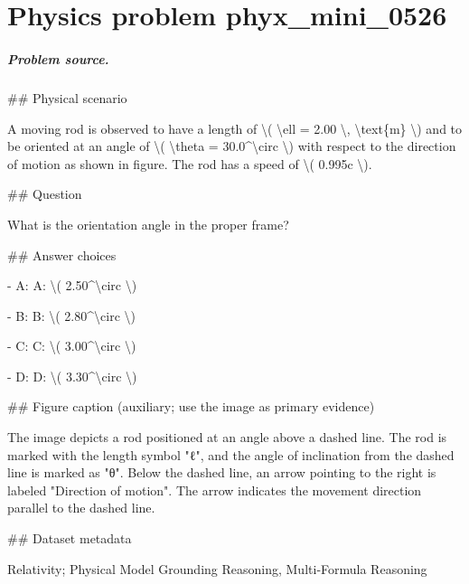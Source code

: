 
\chapter{Physics problem phyx\_mini\_0526}
\label{ch:PhyXMiniProblems_problem_phyx_mini_0526}

\paragraph{Problem source.}
\#\# Physical scenario

A moving rod is observed to have a length of \textbackslash{}( \textbackslash{}ell = 2.00 \textbackslash{}, \textbackslash{}text\{m\} \textbackslash{}) and to be oriented at an angle of \textbackslash{}( \textbackslash{}theta = 30.0\textasciicircum{}\textbackslash{}circ \textbackslash{}) with respect to the direction of motion as shown in figure. The rod has a speed of \textbackslash{}( 0.995c \textbackslash{}).

\#\# Question

What is the orientation angle in the proper frame?

\#\# Answer choices

- A: A: \textbackslash{}( 2.50\textasciicircum{}\textbackslash{}circ \textbackslash{})

- B: B: \textbackslash{}( 2.80\textasciicircum{}\textbackslash{}circ \textbackslash{})

- C: C: \textbackslash{}( 3.00\textasciicircum{}\textbackslash{}circ \textbackslash{})

- D: D: \textbackslash{}( 3.30\textasciicircum{}\textbackslash{}circ \textbackslash{})

\#\# Figure caption (auxiliary; use the image as primary evidence)

The image depicts a rod positioned at an angle above a dashed line. The rod is marked with the length symbol "ℓ", and the angle of inclination from the dashed line is marked as "θ". Below the dashed line, an arrow pointing to the right is labeled "Direction of motion". The arrow indicates the movement direction parallel to the dashed line.

\#\# Dataset metadata

Relativity; Physical Model Grounding Reasoning, Multi-Formula Reasoning

